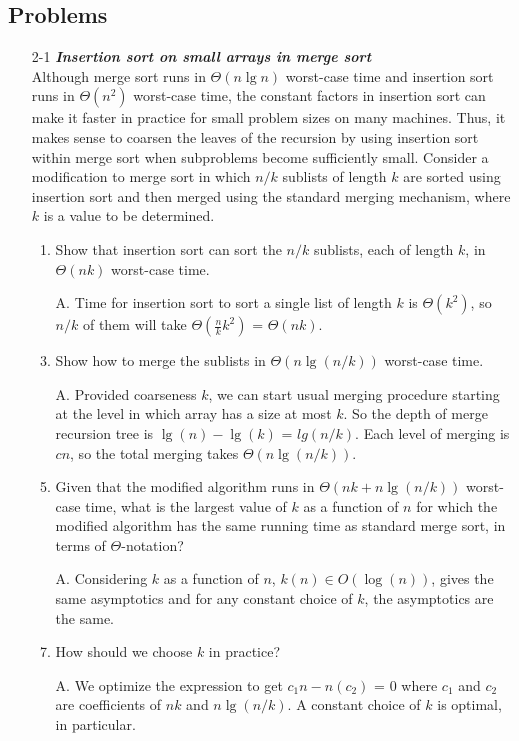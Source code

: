 \documentclass[fontsize=12pt,paper=a4]{book}
\begin{document}
\subsection*{Problems}
\begin{enumerate}
	\item[2-1]
		\textbf{\textit{Insertion sort on small arrays in merge sort}}\\
		Although merge sort runs in $\Theta(n \lg n)$ worst-case time and insertion sort runs in $\Theta(n^2)$ worst-case time, the constant factors in insertion sort can make it faster in practice for small problem sizes on many machines. Thus, it makes sense to coarsen the leaves of the recursion by using insertion sort within merge sort when subproblems become sufficiently small. Consider a modification to merge sort in which $n/k$ sublists of length $k$ are sorted using insertion sort and then merged using the standard merging mechanism, where $k$ is a value to be determined.
		\begin{enumerate}
			\item Show that insertion sort can sort the $n/k$ sublists, each of length $k$, in $\Theta(nk)$ worst-case time.
			\item[A.]
			Time for insertion sort to sort a single list of length $k$ is $\Theta(k^2)$, so $n/k$ of them will take $\Theta(\frac{n}{k} k^2)$ = $\Theta(nk)$.			
			
			\item Show how to merge the sublists in $\Theta(n \lg(n/k))$ worst-case time.
			\item[A.]
			Provided coarseness $k$, we can start usual merging procedure starting at the level in which array has a size at most $k$. So the depth of merge recursion tree is $\lg(n)-\lg(k)$ = $lg(n/k)$. Each level of merging is $cn$, so the total merging takes $\Theta(n \lg(n/k))$.			
			
			\item Given that the modified algorithm runs in $\Theta(nk + n \lg(n/k))$ worst-case time, what is the largest value of $k$ as a function of $n$ for which the modified algorithm has the same running time as standard merge sort, in terms of $\Theta$-notation?
			\item[A.]
			Considering $k$ as a function of $n$, $k(n)\in O(\log(n))$, gives the same asymptotics and for any constant choice of $k$, the asymptotics are the same.
			
			\item How should we choose $k$ in practice?
			\item[A.]
			We optimize the expression to get $c_1n - n(c_2)$ = 0 where $c_1$ and $c_2$ are coefficients of $nk$ and $n \lg(n/k)$. A constant choice of $k$ is optimal, in particular.
		\end{enumerate}	
		

\end{enumerate}
\end{document}
